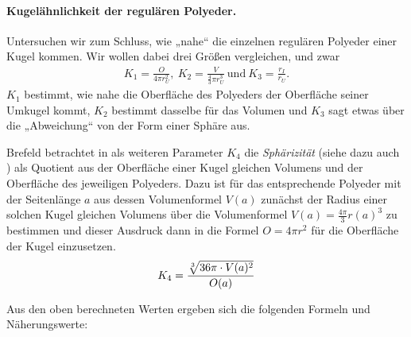 \documentclass[11pt]{article}
\begin{document}
\paragraph{Kugelähnlichkeit der regulären Polyeder.}
Untersuchen wir zum Schluss, wie „nahe“ die einzelnen regulären Polyeder einer
Kugel kommen.  Wir wollen dabei drei Größen vergleichen, und zwar
\begin{gather*}
  K_1=\frac{O}{4\pi r_U^2},\ K_2=\frac{V}{\frac43\pi
    r_U^3}\ \text{und}\ K_3=\frac{r_I}{r_U}.
\end{gather*}
$K_1$ bestimmt, wie nahe die Oberfläche des Polyeders der Oberfläche seiner
Umkugel kommt, $K_2$ bestimmt dasselbe für das Volumen und $K_3$ sagt etwas
über die „Abweichung“ von der Form einer Sphäre aus.

Brefeld betrachtet in \cite{Brefeld} als weiteren Parameter $K_4$ die
\emph{Sphärizität} (siehe dazu auch \cite{Sphaer}) als Quotient aus der
Oberfläche einer Kugel gleichen Volumens und der Oberfläche des jeweiligen
Polyeders.  Dazu ist für das entsprechende Polyeder mit der Seitenlänge $a$
aus dessen Volumenformel $V(a)$ zunächst der Radius einer solchen Kugel
gleichen Volumens über die Volumenformel $V(a)=\frac{4\pi}{3}r(a)^3$ zu
bestimmen und dieser Ausdruck dann in die Formel $O=4\pi r^2$ für die
Oberfläche der Kugel einzusetzen.
\begin{gather*}
  K_4=\frac{\sqrt[3]{36\pi\cdot V(a)^2}}{O(a)}
\end{gather*}

Aus den oben berechneten Werten ergeben sich die folgenden Formeln und
Näherungswerte:
\end{document}
